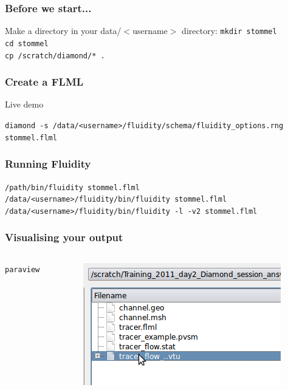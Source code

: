 \documentclass[12pt]{beamer}
\begin{document}
\begin{frame}
    \frametitle{Before we start...}

Make a directory in your data/$<$username$>$ directory: \texttt{mkdir stommel}
\\
\texttt{cd stommel}
\\
\texttt{cp /scratch/diamond/* .}
\end{frame}


\begin{frame}
    \frametitle{Create a FLML}
Live demo

\texttt{diamond -s /data/<username>/fluidity/schema/fluidity\_options.rng stommel.flml}
\end{frame}

\begin{frame}
    \frametitle{Running Fluidity}
\scriptsize{\texttt{/path/bin/fluidity stommel.flml}}
\\
\scriptsize{\texttt{/data/<username>/fluidity/bin/fluidity stommel.flml}}
\\
\scriptsize{\texttt{/data/<username>/fluidity/bin/fluidity -l -v2 stommel.flml}}
\end{frame}


\begin{frame}
	\frametitle{Visualising your output}
\begin{columns}
\begin{column}{0.6\textwidth}

\texttt{paraview}
\end{column}
\begin{column}{0.4\textwidth}
\begin{center}
\includegraphics[width=\textwidth]{images/State_Open.png}
\end{center}
\end{column}
\end{columns}


\end{frame}
\end{document}
